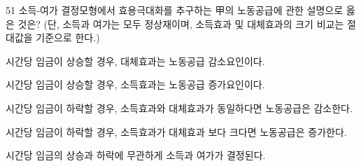 \begin{question}{51}
소득-여가 결정모형에서 효용극대화를 추구하는 甲의 노동공급에 관한 설명으로 옳은 것은? (단, 소득과 여가는 모두 정상재이며, 소득효과 및 대체효과의 크기 비교는 절대값을 기준으로 한다.)
\begin{choices}
  \item 시간당 임금이 상승할 경우, 대체효과는 노동공급 감소요인이다.
  \item 시간당 임금이 상승할 경우, 소득효과는 노동공급 증가요인이다.
  \item 시간당 임금이 하락할 경우, 소득효과와 대체효과가 동일하다면 노동공급은 감소한다.
  \item 시간당 임금이 하락할 경우, 소득효과가 대체효과 보다 크다면 노동공급은 증가한다.
  \item 시간당 임금의 상승과 하락에 무관하게 소득과 여가가 결정된다.
\end{choices}
\end{question}
